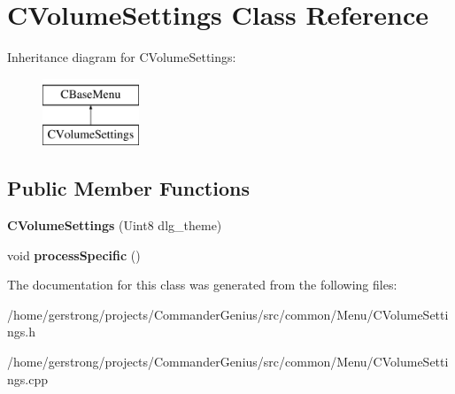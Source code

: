 \hypertarget{class_c_volume_settings}{
\section{CVolumeSettings Class Reference}
\label{class_c_volume_settings}
}
Inheritance diagram for CVolumeSettings:\begin{figure}[H]
\begin{center}
\leavevmode
\includegraphics[height=2cm]{class_c_volume_settings}
\end{center}
\end{figure}
\subsection*{Public Member Functions}
\begin{DoxyCompactItemize}
\item 
\hypertarget{class_c_volume_settings_a14a63e95a12fcd55422e69c6916c0159}{
{\bfseries CVolumeSettings} (Uint8 dlg\_\-theme)}
\label{class_c_volume_settings_a14a63e95a12fcd55422e69c6916c0159}

\item 
\hypertarget{class_c_volume_settings_a35b5d56594ba19e3f1b96f74cd4c6463}{
void {\bfseries processSpecific} ()}
\label{class_c_volume_settings_a35b5d56594ba19e3f1b96f74cd4c6463}

\end{DoxyCompactItemize}


The documentation for this class was generated from the following files:\begin{DoxyCompactItemize}
\item 
/home/gerstrong/projects/CommanderGenius/src/common/Menu/CVolumeSettings.h\item 
/home/gerstrong/projects/CommanderGenius/src/common/Menu/CVolumeSettings.cpp\end{DoxyCompactItemize}
